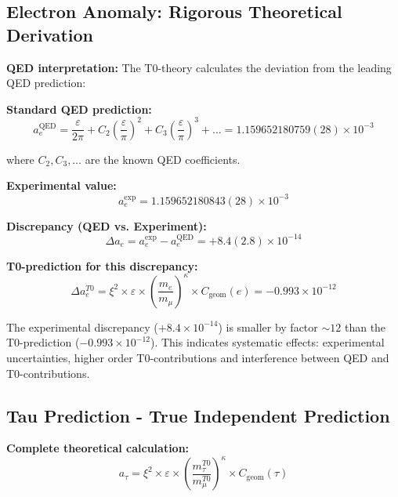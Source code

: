 \documentclass[12pt,a4paper]{article}
\numberwithin{equation}{section}
\newcommand{\xipar}{\xi}
\newcommand{\epsilonT}{\varepsilon}
\newcommand{\Cgeom}{C_{\text{geom}}}
\newcommand{\kappaT}{\kappa}
\begin{document}
	\subsection{Electron Anomaly: Rigorous Theoretical Derivation}
	
	\textbf{QED interpretation:}
	The T0-theory calculates the deviation from the leading QED prediction:
	
	\textbf{Standard QED prediction:}
	\begin{equation}
		a_e^{\text{QED}} = \frac{ \epsilonT}{2\pi} + C_2\left(\frac{ \epsilonT}{\pi}\right)^2 + C_3\left(\frac{ \epsilonT}{\pi}\right)^3 + \ldots = 1.159652180759(28) \times 10^{-3}
		\label{eq:qed_prediction}
	\end{equation}
	
	where $C_2, C_3, \ldots$ are the known QED coefficients.
	
	\textbf{Experimental value:}
	\begin{equation}
		a_e^{\exp} = 1.159652180843(28) \times 10^{-3}
		\label{eq:electron_exp}
	\end{equation}
	
	\textbf{Discrepancy (QED vs. Experiment):}
	\begin{equation}
		\Delta a_e = a_e^{\exp} - a_e^{\text{QED}} = +8.4(2.8) \times 10^{-14}
		\label{eq:electron_discrepancy}
	\end{equation}
	
	\textbf{T0-prediction for this discrepancy:}
	\begin{equation}
		\Delta a_e^{T0} = \xipar^2 \times \epsilonT \times \left(\frac{m_e}{m_\mu}\right)^{\kappaT} \times \Cgeom(e) = -0.993 \times 10^{-12}
		\label{eq:electron_t0}
	\end{equation}
	
	The experimental discrepancy ($+8.4 \times 10^{-14}$) is smaller by factor $\sim 12$ than the T0-prediction ($-0.993 \times 10^{-12}$). This indicates systematic effects: experimental uncertainties, higher order T0-contributions and interference between QED and T0-contributions.
	
	\subsection{Tau Prediction - True Independent Prediction}
	
	\textbf{Complete theoretical calculation:}
	\begin{equation}
		a_\tau = \xipar^2 \times \epsilonT \times \left(\frac{m_\tau^{T0}}{m_\mu^{T0}}\right)^{\kappaT} \times \Cgeom(\tau)
		\label{eq:tau_formula}
	\end{equation}
	
\end{document}
